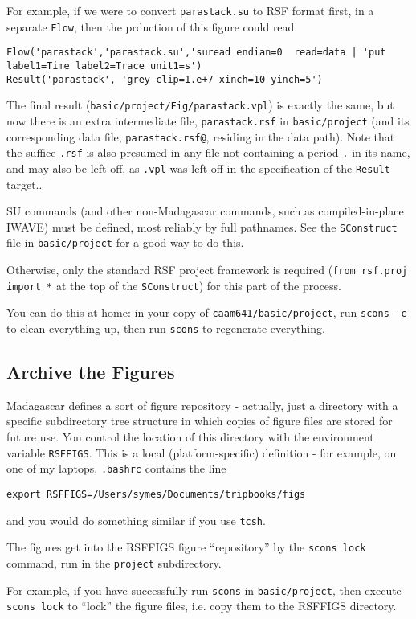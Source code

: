 For example, if we were to convert {\tt parastack.su} to RSF format first, in a separate {\tt Flow}, then the prduction of this figure could read
\begin{verbatim}
Flow('parastack','parastack.su','suread endian=0  read=data | 'put label1=Time label2=Trace unit1=s')
Result('parastack', 'grey clip=1.e+7 xinch=10 yinch=5')
\end{verbatim}
The final result ({\tt basic/project/Fig/parastack.vpl}) is exactly the same, but now there is an extra intermediate file, {\tt parastack.rsf} in {\tt basic/project} (and its corresponding data file, {\tt parastack.rsf@}, residing in the data path). Note that the suffice {\tt .rsf} is also presumed in any file not containing a period {\tt .} in its name, and may also be left off, as {\tt .vpl} was left off in the specification of the {\tt Result} target..

SU commands (and other non-Madagascar commands, such as compiled-in-place IWAVE) must be defined, most reliably by full pathnames. See the {\tt SConstruct} file in {\tt basic/project} for a good way to do this.

Otherwise, only the standard RSF project framework is required ({\tt from rsf.proj import *} at the top of the {\tt SConstruct}) for this part of the process.

You can do this at home: in your copy of {\tt caam641/basic/project}, run {\tt scons -c} to clean everything up, then run {\tt scons} to regenerate everything.

\subsection{Archive the Figures}
Madagascar defines a sort of figure repository - actually, just a directory with a specific subdirectory tree structure in which copies of figure files are stored for future use. You control the location of this directory with the environment variable {\tt RSFFIGS}.  This is a local (platform-specific) definition - for example, on one of my laptops, {\tt .bashrc} contains the line
\begin{verbatim}
export RSFFIGS=/Users/symes/Documents/tripbooks/figs
\end{verbatim}
and you would do something similar if you use {\tt tcsh}.

The figures get into the RSFFIGS figure ``repository'' by the {\tt scons lock} command, run in the {\tt project} subdirectory. 

For example, if you have successfully run {\tt scons} in {\tt basic/project}, then execute {\tt scons lock} to ``lock'' the figure files, i.e. copy them to the RSFFIGS directory. 

